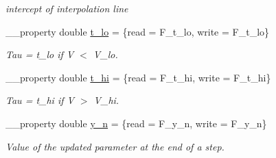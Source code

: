\begin{DoxyCompactItemize}
\begin{DoxyCompactList}\small\item\em intercept of interpolation line \end{DoxyCompactList}\item 
\hypertarget{class_t_h_h_linear_piecewise_kinetics_factor_a84c7ea0344463455e6b35eb4c679f1a2}{\+\_\+\+\_\+property double \hyperlink{class_t_h_h_linear_piecewise_kinetics_factor_a84c7ea0344463455e6b35eb4c679f1a2}{t\+\_\+lo} = \{read = F\+\_\+t\+\_\+lo, write = F\+\_\+t\+\_\+lo\}}\label{class_t_h_h_linear_piecewise_kinetics_factor_a84c7ea0344463455e6b35eb4c679f1a2}

\begin{DoxyCompactList}\small\item\em Tau = t\+\_\+lo if V $<$ V\+\_\+lo. \end{DoxyCompactList}\item 
\hypertarget{class_t_h_h_linear_piecewise_kinetics_factor_a37584a8a4d82b84d7c56ba1f3b44f97a}{\+\_\+\+\_\+property double \hyperlink{class_t_h_h_linear_piecewise_kinetics_factor_a37584a8a4d82b84d7c56ba1f3b44f97a}{t\+\_\+hi} = \{read = F\+\_\+t\+\_\+hi, write = F\+\_\+t\+\_\+hi\}}\label{class_t_h_h_linear_piecewise_kinetics_factor_a37584a8a4d82b84d7c56ba1f3b44f97a}

\begin{DoxyCompactList}\small\item\em Tau = t\+\_\+hi if V $>$ V\+\_\+hi. \end{DoxyCompactList}\item 
\hypertarget{class_t_h_h_linear_piecewise_kinetics_factor_a5e6df3d4e2c80f117f9a453035975a18}{\+\_\+\+\_\+property double \hyperlink{class_t_h_h_linear_piecewise_kinetics_factor_a5e6df3d4e2c80f117f9a453035975a18}{y\+\_\+n} = \{read = F\+\_\+y\+\_\+n, write = F\+\_\+y\+\_\+n\}}\label{class_t_h_h_linear_piecewise_kinetics_factor_a5e6df3d4e2c80f117f9a453035975a18}

\begin{DoxyCompactList}\small\item\em Value of the updated parameter at the end of a step. \end{DoxyCompactList}\end{DoxyCompactItemize}
